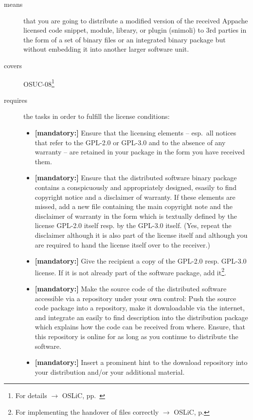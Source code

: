 \begin{description}
\item[means] that you are going to distribute a modified version of the received
Appache licensed code snippet, module, library, or plugin (snimoli) to 3rd
parties in the form of a set of binary files or an integrated binary package but
without embedding it into another larger software unit.
\item[covers] OSUC-08\footnote{For details $\rightarrow$ OSLiC, pp.\ \pageref{OSUC-08-DEF}}
\item[requires] the tasks in order to fulfill the license conditions:
\begin{itemize}

  \item \textbf{[mandatory:]} Ensure that the licensing elements -- esp.\ all
  notices that refer to the GPL-2.0 or GPL-3.0 and to the absence of any
  warranty -- are retained in your package in the form you have received them.

  \item \textbf{[mandatory:]} Ensure that the distributed software binary
  package contains a conspicuously and appropriately designed, esasily to find
  copyright notice and a disclaimer of warranty. If these elements are missed,
  add a new file containing the main copyright note and the disclaimer of
  warranty in the form which is textually defined by the license GPL-2.0 itself
  resp. by the GPL-3.0 itself. (Yes, repeat the disclaimer although it is also
  part of the license itself and although you are required to hand the license
  itself over to the receiver.)
  
  \item \textbf{[mandatory:]} Give the recipient a copy of the GPL-2.0 resp.
  GPL-3.0 license. If it is not already part of the software package, add
  it\footnote{For implementing the handover of files correctly $\rightarrow$
  OSLiC, p. \pageref{DistributingFilesHint}}.

  \item \textbf{[mandatory:]} Make the source code of the distributed software
  accessible via a repository under your own control: Push the source code
  package into a repository, make it downloadable via the internet, and
  integrate an easily to find description into the distribution package which
  explains how the code can be received from where. Ensure, that this repository
  is online for as long as you continue to distribute the software.
  
  \item \textbf{[mandatory:]} Insert a prominent hint to the download repository
  into your distribution and/or your additional material.
  

\end{itemize}
\end{description}
